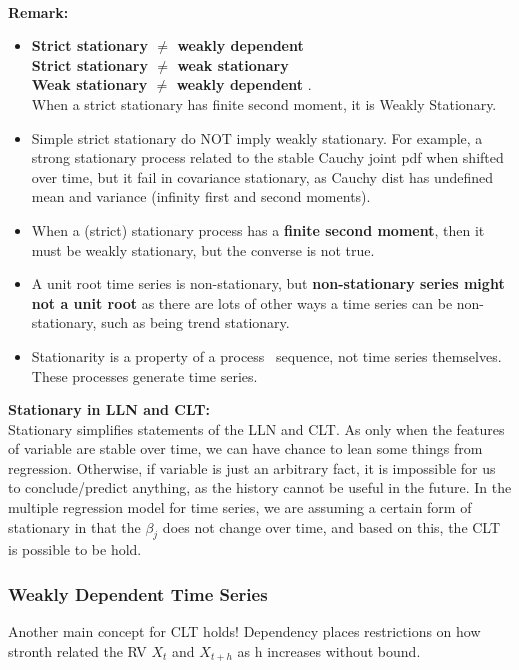 \documentclass[12pt]{article}
\begin{document}
\\
\noindent
{\color{ForestGreen}\textbf{Remark: }} 
\begin{itemize}
\item
\textbf{Strict stationary $\ne$ weakly dependent \\
Strict stationary $\ne$ weak stationary \\
Weak stationary $\ne$ weakly dependent
}.\\ When a strict stationary has finite second moment, it is Weakly Stationary. 
\item 
Simple strict stationary do NOT imply weakly stationary.
For example, a strong stationary process related to the stable Cauchy joint pdf when shifted over time, but it fail in covariance stationary, as Cauchy dist has undefined mean and variance (infinity first and second moments).
\item
When a (strict) stationary process has a \textbf{finite second moment}, then it must be weakly stationary, but the converse is not true. 
\item
A unit root time series is non-stationary, but \textbf{non-stationary series might not a unit root} as there are lots of other ways a time series can be non-stationary, such as being trend stationary.
\item
Stationarity is a property of a process \ sequence, not time series themselves. These processes generate time series.

\end{itemize}
{\color{Mulberry}\textbf{Stationary in LLN and CLT: }}\\
Stationary simplifies statements of the LLN and CLT. As only when the features of variable are stable over time, we can have chance to lean some things from regression. Otherwise, if variable is just an arbitrary fact, it is impossible for us to conclude/predict anything, as the history cannot be useful in the future. In the multiple regression model for time series, we are assuming a certain form of stationary in that the $\beta_j$ does not change over time, and based on this, the CLT is possible to be hold.\\


{\color{RoyalBlue}
\subsubsection{Weakly Dependent Time Series}}
Another main concept for CLT holds!
Dependency places restrictions on how stronth related the RV $X_t$ and $X_{t+h}$ as h increases without bound. 
\\
\end{document}
